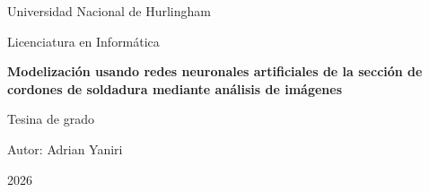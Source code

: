 \documentclass[12pt,a4paper]{report}
\begin{document}
\begin{titlepage}

\centering

{\large Universidad Nacional de Hurlingham\par}

\vspace{1cm}

{\large Licenciatura en Informática\par}

\vspace{3cm}

{\Large\bfseries
Modelización usando redes neuronales artificiales de la sección de cordones de soldadura mediante análisis de imágenes
\par}

\vspace{2cm}

{\large Tesina de grado\par}

\vfill

{\large
Autor: Adrian Yaniri
\par}

\vspace{0.5cm}

{\large
2026
\par}

\end{titlepage}
\tableofcontents






\end{document}
